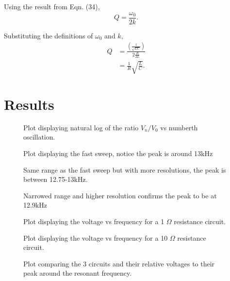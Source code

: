 \documentclass{article}
\begin{document}
Using the result from Eqn. (34),
\begin{equation}
    Q = \frac{\omega_0}{2k}.
\end{equation}

Substituting the definitions of $\omega_0$ and $k$,
\begin{equation}
    \begin{split}
        Q &= \frac{(\frac{1}{\sqrt{LC}})}{2\frac{R}{2L}} \\
        &= \frac{1}{R}\sqrt{\frac{L}{C}}. 
    \end{split}
\end{equation}

\section{Results}
\begin{figure}[H]
    \centering
    \scalebox{0.75}{}
    \caption{Plot displaying natural log of the ratio $V_n/V_0$ vs 
    numberth oscillation.}
    \label{fig:plot1}
\end{figure}
\begin{figure}[H]
    \centering
    \scalebox{0.75}{}
    \caption{Plot displaying the fast sweep, notice the peak is
    around 13kHz}
    \label{fig:plot2}
\end{figure}
\begin{figure}[H]
    \centering
    \scalebox{0.75}{}
    \caption{Same range as the fast sweep but with more resolutions,
    the peak is between 12.75-13kHz.}
    \label{fig:plot3}
\end{figure}
\begin{figure}[H]
    \centering
    \scalebox{0.75}{}
    \caption{Narrowed range and higher resolution confirms the peak
    to be at 12.9kHz}
    \label{fig:plot4}
\end{figure}
\begin{figure}[H]
    \centering
    \scalebox{0.75}{}
    \caption{Plot displaying the voltage vs frequency for a 1 $\Omega$
    resistance circuit.}
    \label{fig:plot5}
\end{figure}
\begin{figure}[H]
    \centering
    \scalebox{0.75}{}
    \caption{Plot displaying the voltage vs frequency for a 10 $\Omega$
    resistance circuit.}
    \label{fig:plot6}
\end{figure}
\begin{figure}[H]
    \centering
    \scalebox{0.75}{}
    \caption{Plot comparing the 3 circuits and their relative voltages to
    their peak around the resonant frequency.}
    \label{fig:plot7}
\end{figure}
\end{document}

